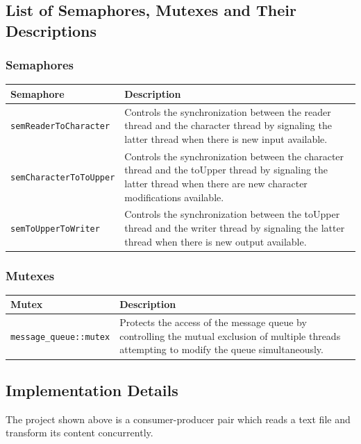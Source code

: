 \documentclass{article}
\begin{document}
\subsection{List of Semaphores, Mutexes and Their Descriptions}
\subsubsection{Semaphores}
\begin{center}
\begin{tabular}{|p{4cm}|p{7cm}|}
\hline
\textbf{Semaphore} & \textbf{Description} \\ \hline
\texttt{semReaderToCharacter} & Controls the synchronization between the reader thread and the character thread by signaling the latter thread when there is new input available. \\ \hline
\texttt{semCharacterToToUpper} & Controls the synchronization between the character thread and the toUpper thread by signaling the latter thread when there are new character modifications available. \\ \hline
\texttt{semToUpperToWriter} & Controls the synchronization between the toUpper thread and the writer thread by signaling the latter thread when there is new output available. \\
\hline
\end{tabular}
\end{center}

\subsubsection{Mutexes}
\begin{center}
\begin{tabular}{|p{4cm}|p{7cm}|}
\hline
\textbf{Mutex} & \textbf{Description} \\ \hline
\texttt{message\_queue::mutex} & Protects the access of the message queue by controlling the mutual exclusion of multiple threads attempting to modify the queue simultaneously. \\ 
\hline
\end{tabular}
\end{center}

\subsection{Implementation Details}
The project shown above is a consumer-producer pair which reads a text file and transform its content concurrently.
\end{document}
